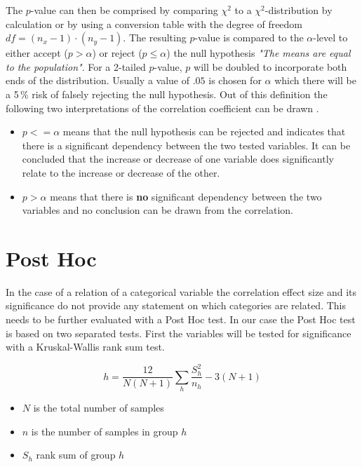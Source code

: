 \medskip

The $p$-value can then be comprised by comparing $\chi^2$ to a $\chi^2$-distribution by calculation or by using a conversion table \parencite{Piegorsch2002} with the degree of freedom $df = (n_x - 1) \cdot (n_y - 1)$. The resulting  $p$-value is compared to the $\alpha$-level to either accept ($p > \alpha$) or reject ($p \le \alpha$) the null hypothesis \textit{"The means are equal to the population"}. For a 2-tailed $p$-value, $p$ will be doubled to incorporate both ends of the distribution. Usually a value of $.05$ is chosen for $\alpha$ which there will be a 5\,\% risk of falsely rejecting the null hypothesis. Out of this definition the following two interpretations of the correlation coefficient can be drawn \parencite{Tenny2020,OTSD2020}.

\begin{itemize}
	\item $p <= \alpha$ means that the null hypothesis can be rejected and indicates that there is a significant dependency between the two tested variables. It can be concluded that the increase or decrease of one variable does significantly relate to the increase or decrease of the other.
	\item $p > \alpha$ means that there is \textbf{no} significant dependency between the two variables and no conclusion can be drawn from the correlation.
\end{itemize}

\section{Post Hoc}
\label{correlation_posthoc}
In the case of a relation of a categorical variable the correlation effect size and its significance do not provide any statement on which categories are related. This needs to be further evaluated with a Post Hoc test. In our case the Post Hoc test is based on two separated tests. First the variables will be tested for significance with a Kruskal-Wallis rank sum test. 

\smallskip
\begin{equation}
\label{formula_kruskal_wallis}	
	h = \frac{12}{N(N+1)}\sum_{h}{\frac{S_h^2}{n_h}}-3(N+1)
\end{equation}
\begin{itemize}
	\setlength\itemsep{0.1em}	
	\item[] $N$ is the total number of samples 
	\item[] $n$ is the number of samples in group $h$
	\item[] $S_h$ rank sum of group $h$
\end{itemize}


